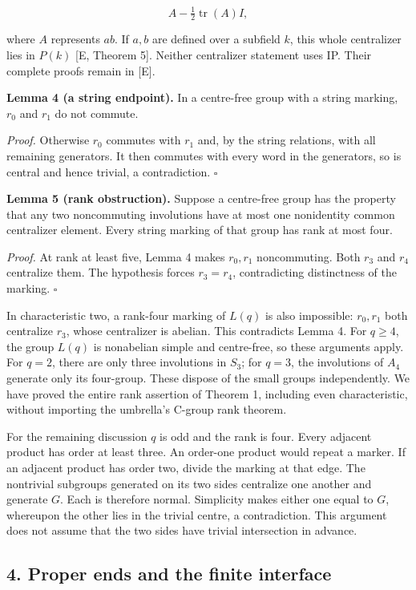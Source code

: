 \documentclass[
  11pt,
]{article}
\begin{document}
\[ A-\tfrac12\operatorname{tr}(A)I, \tag{1} \]

where \(A\) represents \(ab\). If \(a,b\) are defined over a subfield
\(k\), this whole centralizer lies in \(P(k)\) {[}E, Theorem 5{]}.
Neither centralizer statement uses IP. Their complete proofs remain in
{[}E{]}.

\textbf{Lemma 4 (a string endpoint).} In a centre-free group with a
string marking, \(r_0\) and \(r_1\) do not commute.

\emph{Proof.} Otherwise \(r_0\) commutes with \(r_1\) and, by the string
relations, with all remaining generators. It then commutes with every
word in the generators, so is central and hence trivial, a
contradiction. \(\square\)

\textbf{Lemma 5 (rank obstruction).} Suppose a centre-free group has the
property that any two noncommuting involutions have at most one
nonidentity common centralizer element. Every string marking of that
group has rank at most four.

\emph{Proof.} At rank at least five, Lemma 4 makes \(r_0,r_1\)
noncommuting. Both \(r_3\) and \(r_4\) centralize them. The hypothesis
forces \(r_3=r_4\), contradicting distinctness of the marking.
\(\square\)

In characteristic two, a rank-four marking of \(L(q)\) is also
impossible: \(r_0,r_1\) both centralize \(r_3\), whose centralizer is
abelian. This contradicts Lemma 4. For \(q\ge4\), the group \(L(q)\) is
nonabelian simple and centre-free, so these arguments apply. For
\(q=2\), there are only three involutions in \(S_3\); for \(q=3\), the
involutions of \(A_4\) generate only its four-group. These dispose of
the small groups independently. We have proved the entire rank assertion
of Theorem 1, including even characteristic, without importing the
umbrella's C-group rank theorem.

For the remaining discussion \(q\) is odd and the rank is four. Every
adjacent product has order at least three. An order-one product would
repeat a marker. If an adjacent product has order two, divide the
marking at that edge. The nontrivial subgroups generated on its two
sides centralize one another and generate \(G\). Each is therefore
normal. Simplicity makes either one equal to \(G\), whereupon the other
lies in the trivial centre, a contradiction. This argument does not
assume that the two sides have trivial intersection in advance.

\subsection{4. Proper ends and the finite
interface}\label{proper-ends-and-the-finite-interface}
\end{document}
